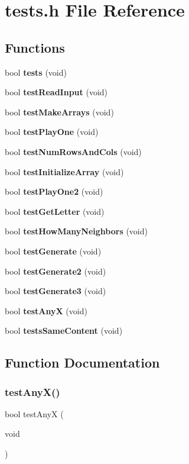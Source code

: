 \section{tests.\+h File Reference}
\label{tests_8h}
\subsection*{Functions}
\begin{DoxyCompactItemize}
\item 
bool \textbf{ tests} (void)
\item 
bool \textbf{ test\+Read\+Input} (void)
\item 
bool \textbf{ test\+Make\+Arrays} (void)
\item 
bool \textbf{ test\+Play\+One} (void)
\item 
bool \textbf{ test\+Num\+Rows\+And\+Cols} (void)
\item 
bool \textbf{ test\+Initialize\+Array} (void)
\item 
bool \textbf{ test\+Play\+One2} (void)
\item 
bool \textbf{ test\+Get\+Letter} (void)
\item 
bool \textbf{ test\+How\+Many\+Neighbors} (void)
\item 
bool \textbf{ test\+Generate} (void)
\item 
bool \textbf{ test\+Generate2} (void)
\item 
bool \textbf{ test\+Generate3} (void)
\item 
bool \textbf{ test\+AnyX} (void)
\item 
bool \textbf{ tests\+Same\+Content} (void)
\end{DoxyCompactItemize}


\subsection{Function Documentation}
\mbox{\label{tests_8h_a9136792bde961164c06bcdde7ab1d5f5}} 
\subsubsection{test\+Any\+X()}
{\footnotesize\ttfamily bool test\+AnyX (\begin{DoxyParamCaption}\item[{void}]{ }\end{DoxyParamCaption})}

